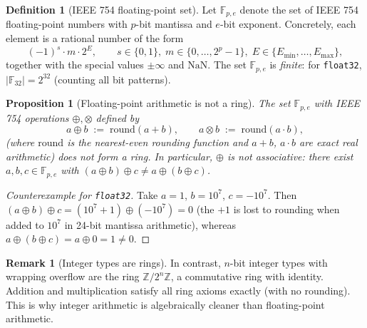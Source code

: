 \documentclass[11pt]{amsart}
\theoremstyle{plain}
\newtheorem{proposition}[theorem]{Proposition}
\theoremstyle{definition}
\newtheorem{definition}[theorem]{Definition}
\newtheorem{remark}[theorem]{Remark}
\begin{document}
\begin{definition}[IEEE 754 floating-point set]
Let $\mathbb{F}_{p,e}$ denote the set of IEEE 754 floating-point numbers with
$p$-bit mantissa and $e$-bit exponent.  Concretely, each element is a rational
number of the form
\[
    (-1)^s \cdot m \cdot 2^E, \qquad s \in \{0,1\},\; m \in \{0,\ldots, 2^p-1\},\;
    E \in \{E_{\min},\ldots,E_{\max}\},
\]
together with the special values $\pm\infty$ and $\mathrm{NaN}$.
The set $\mathbb{F}_{p,e}$ is \emph{finite}: for \texttt{float32},
$|\mathbb{F}_{32}| = 2^{32}$ (counting all bit patterns).
\end{definition}

\begin{proposition}[Floating-point arithmetic is not a ring]
\label{prop:fp-not-ring}
The set $\mathbb{F}_{p,e}$ with IEEE 754 operations $\oplus, \otimes$ defined by
\[
    a \oplus b \;:=\; \mathrm{round}(a + b), \qquad
    a \otimes b \;:=\; \mathrm{round}(a \cdot b),
\]
(where $\mathrm{round}$ is the nearest-even rounding function and $a + b$,
$a \cdot b$ are exact real arithmetic) does \emph{not} form a ring.
In particular, $\oplus$ is not associative: there exist $a, b, c \in
\mathbb{F}_{p,e}$ with $(a \oplus b) \oplus c \neq a \oplus (b \oplus c)$.
\end{proposition}
\begin{proof}[Counterexample for \texttt{float32}]
Take $a = 1$, $b = 10^7$, $c = -10^7$.  Then
$(a \oplus b) \oplus c = (10^7 + 1) \oplus (-10^7) = 0$ (the $+1$ is lost to
rounding when added to $10^7$ in 24-bit mantissa arithmetic), whereas
$a \oplus (b \oplus c) = a \oplus 0 = 1 \neq 0$.
\end{proof}

\begin{remark}[Integer types are rings]
\label{rem:int-ring}
In contrast, $n$-bit integer types with wrapping overflow are the ring
$\mathbb{Z}/2^n\mathbb{Z}$, a commutative ring with identity.  Addition and
multiplication satisfy all ring axioms exactly (with no rounding).  This is why
integer arithmetic is algebraically cleaner than floating-point arithmetic.
\end{remark}
\end{document}

